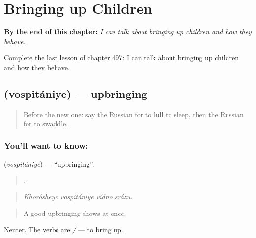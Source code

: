 
\chapter{Bringing up Children}
\label{ch:ru-bringing-up-children}

\begin{chapteropening}
\textbf{By the end of this chapter:} \emph{I can talk about bringing up children and how they behave.}

Complete the last lesson of chapter 497: I can talk about bringing up children and how they behave.
\end{chapteropening}

\section[\texorpdfstring{\ru{воспитание} (vospitániye)}{воспитание (vospitániye)}]{ (vospitániye) — upbringing}

\label{lesson:RU-C497-vospitaniye}



\begin{quote}
Before the new one: say the Russian for to lull to sleep, then the Russian for to swaddle.
\end{quote}

\subsection*{You'll want to know: }
\textbf{} (\emph{vospitániye}) — \textquotedblleft{}upbringing\textquotedblright{}.

\begin{quote}
   .
\end{quote}

\begin{quote}
\emph{Khorósheye vospitániye vídno srázu.}
\end{quote}

\begin{quote}
A good upbringing shows at once.
\end{quote}

Neuter. The verbs are \emph{ / } — to bring up.

